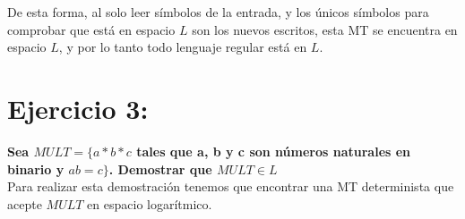\documentclass{article}
\begin{document}
De esta forma, al solo leer símbolos de la entrada, y los únicos símbolos para comprobar que está en espacio $L$ son los nuevos escritos, esta MT se encuentra en espacio $L$, y por lo tanto todo lenguaje regular está en $L$.


\newpage

\section*{Ejercicio 3:}

\Large{\textbf{Sea $MULT = \{a * b * c$ tales que a, b y c son números naturales en binario y $a  b = c\}$. Demostrar que $MULT \in L$}}
\\

\normalsize
Para realizar esta demostración tenemos que encontrar una MT determinista que acepte $MULT$ en espacio logarítmico.
\end{document}
